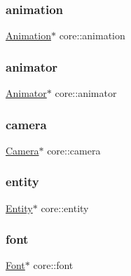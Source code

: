 \mbox{\label{namespacecore_acb97154ea6e035e44613e11f6df6a50b}} 
\subsubsection{\texorpdfstring{animation}{animation}}
{\footnotesize\ttfamily \hyperlink{classanimation_1_1Animation}{Animation}$\ast$ core\+::animation}

\mbox{\label{namespacecore_af734c64894d0dfcd75e6c6c8ca62d29b}} 
\subsubsection{\texorpdfstring{animator}{animator}}
{\footnotesize\ttfamily \hyperlink{classanimation_1_1Animator}{Animator}$\ast$ core\+::animator}

\mbox{\label{namespacecore_a9d645c490b142886301256f6cf9c65c2}} 
\subsubsection{\texorpdfstring{camera}{camera}}
{\footnotesize\ttfamily \hyperlink{classentity_1_1Camera}{Camera}$\ast$ core\+::camera}

\mbox{\label{namespacecore_aa710c0ea388433d2d80d1d1c67582eda}} 
\subsubsection{\texorpdfstring{entity}{entity}}
{\footnotesize\ttfamily \hyperlink{classentity_1_1Entity}{Entity}$\ast$ core\+::entity}

\mbox{\label{namespacecore_a9c0aadaade788b336cfbba4db9c87a8e}} 
\subsubsection{\texorpdfstring{font}{font}}
{\footnotesize\ttfamily \hyperlink{classfont_1_1Font}{Font}$\ast$ core\+::font}


